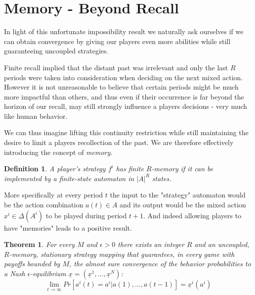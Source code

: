 \documentclass[a4paper]{article}
\theoremstyle{plain}
\newtheorem{theorem}{Theorem}
\newtheorem{definition}{Definition}
\theoremstyle{remark}
\newcommand{\eq}[1]{\underline{#1}}
\begin{document}
\section{Memory - Beyond Recall}

In light of this unfortunate impossibility result we naturally ask ourselves if we can obtain convergence
by giving our players even more abilities while still guaranteeing uncoupled strategies.

Finite recall implied that the distant past was irrelevant and only the last $R$ periods were taken
into consideration when deciding on the next mixed action. However it is not unreasonable to believe that
certain periods might be much more impactful than others, and thus even if their
occurrence is far beyond the horizon of our recall, may still strongly influence a players decisions
- very much like human behavior.

We can thus imagine lifting this continuity restriction while still maintaining the desire to limit a players
recollection of the past. We are therefore effectively introducing the concept of \emph{memory}.

\begin{definition}
	A player's strategy $f^i$ has finite $R$-memory if it can be implemented by a finite-state 
	automaton in $|A|^R$ states.
\end{definition}

More specifically at every period $t$ the input to the "strategy" automaton would be the action
combination $a(t) \in A$ and its output would be the mixed action $x^i \in \Delta(A^i)$ to be played 
during period $t+1$.
And indeed allowing players to have "memories" leads to a positive result.


\begin{theorem}
	For every $M$ and $\epsilon > 0$ there exists an integer $R$ and an uncoupled, $R$-memory,
	stationary strategy mapping that guarantees, in every game with payoffs bounded by $M$, the
	almost sure convergence of the behavior probabilities to a Nash $\epsilon$-equilibrium $\eq{x} = (\eq{x}^1, ..., \eq{x}^N)$:
	\[
		\lim_{t \to \infty} Pr[a^i(t) = a^i | a(1), ..., a(t-1) ] = \eq{x}^i(a^i)
	\]
\end{theorem}
\end{document}
